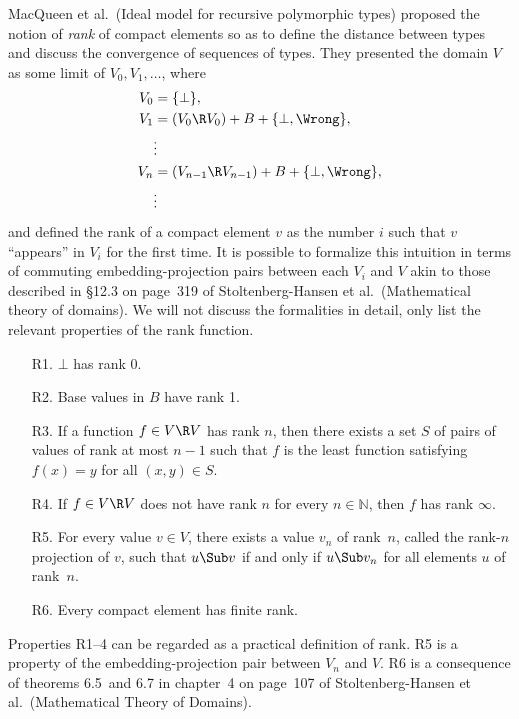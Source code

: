 \documentclass{amsart}
\begin{document}
MacQueen et al.\ (Ideal model for recursive polymorphic types)
proposed the notion of \emph{rank} of compact elements so as to
define the distance between types and discuss the convergence of
sequences of types. They presented the domain $V$ as some limit
of $V_0,V_1,\ldots$, where
\begin{align*}
V_0 &= \{\bot\},\\
V_1 &= (V_0\R V_0)+B+\{\bot,\Wrong\},\\
&\vdots\\
V_n &= (V_{n-1} \R V_{n-1}) + B + \{\bot,\Wrong\},\\
&\vdots
\end{align*}
and defined the rank of a compact element $v$ as the number $i$
such that $v$ ``appears'' in $V_i$ for the first time. It is
possible to formalize this intuition in terms of commuting
embedding-projection pairs between each $V_i$ and $V$ akin to
those described in \S12.3 on page~319 of Stoltenberg-Hansen et
al.\ (Mathematical theory of domains). We will not discuss the
formalities in detail, only list the relevant properties of the
rank function.
\begin{itemize}\itemsep=1ex
\item[R1.] $\bot$ has rank 0.

\item[R2.] Base values in $B$ have rank 1.

\item[R3.] If a function $f\in V\R V$ has rank $n$, then there
exists a set $S$ of pairs of values of rank at most $n-1$ such
that $f$ is the least function satisfying $f(x)=y$ for all
$(x,y)\in S$.

\item[R4.] If $f\in V \R V$ does not have rank $n$ for every
$n\in\mathbb N$, then $f$ has rank $\infty$.

\item[R5.] For every value $v\in V$, there exists a value $v_n$
of rank~$n$, called the rank-$n$ projection of $v$, such that $u
\Sub v$ if and only if $u\Sub v_n$ for all elements $u$ of
rank~$n$.

\item[R6.] Every compact element has finite rank.
\end{itemize}
Properties R1--4 can be regarded as a practical definition of
rank. R5 is a property of the embedding-projection pair between
$V_n$ and $V$. R6 is a consequence of theorems 6.5~and 6.7 in
chapter~4 on page~107 of Stoltenberg-Hansen et al.\ (Mathematical
Theory of Domains).
\end{document}
